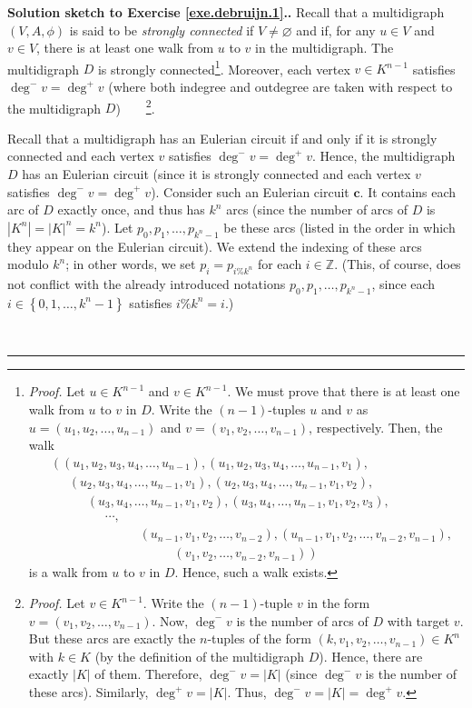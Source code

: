 \documentclass[numbers=enddot,12pt,final,onecolumn,notitlepage]{scrartcl}%
\theoremstyle{definition}
\newenvironment{proof}[1][Proof]{\noindent\textbf{#1.} }{\ \rule{0.5em}{0.5em}}
\newcommand{\ZZ}{\mathbb{Z}}
\newcommand{\set}[1]{\left\{ #1 \right\}}
\newcommand{\abs}[1]{\left| #1 \right|}
\newcommand{\tup}[1]{\left( #1 \right)}
\begin{document}
\begin{proof}[Solution sketch to Exercise \ref{exe.debruijn.1}.]
Recall that a multidigraph $\tup{V, A, \phi}$ is said to be
\textit{strongly connected} if $V \neq \varnothing$ and if, for any
$u \in V$ and $v \in V$, there is at least one walk from $u$ to $v$
in the multidigraph.
The multidigraph $D$ is strongly connected\footnote{\textit{Proof.}
Let $u \in K^{n-1}$ and $v \in K^{n-1}$. We must prove that there is
at least one walk from $u$ to $v$ in $D$. Write the $\tup{n-1}$-tuples
$u$ and $v$ as $u = \tup{u_1, u_2, \ldots, u_{n-1}}$ and
$v = \tup{v_1, v_2, \ldots, v_{n-1}}$, respectively.
Then, the walk
\begin{align*}
& \left( \tup{u_1, u_2, u_3, u_4, \ldots, u_{n-1}} , \tup{u_1, u_2, u_3, u_4, \ldots, u_{n-1}, v_1} , \right. \\
& \left. \phantom{u_1, } \tup{u_2, u_3, u_4, \ldots, u_{n-1}, v_1} , \tup{u_2, u_3, u_4, \ldots, u_{n-1}, v_1, v_2} , \right. \\
& \left. \phantom{u_1, u_2, } \tup{u_3, u_4, \ldots, u_{n-1}, v_1, v_2} , \tup{u_3, u_4, \ldots, u_{n-1}, v_1, v_2, v_3} , \right. \\
& \left. \phantom{u_1, u_2, u_3, } \cdots , \right. \\
& \left. \phantom{u_1, u_2, u_3, u_4, \ldots, } \tup{u_{n-1}, v_1, v_2, \ldots, v_{n-2}} , \tup{u_{n-1}, v_1, v_2, \ldots, v_{n-2}, v_{n-1}} , \right. \\
& \left. \phantom{u_1, u_2, u_3, u_4, \ldots, u_{n-1}, } \tup{v_1, v_2, \ldots, v_{n-2}, v_{n-1}} \right)
\end{align*}
is a walk from $u$ to $v$ in $D$. Hence, such a walk exists.}.
Moreover, each vertex $v \in K^{n-1}$ satisfies
$\deg^- v = \deg^+ v$ (where both indegree and outdegree are taken
with respect to the multidigraph $D$)\ \ \ \ \footnote{\textit{Proof.}
Let $v \in K^{n-1}$. Write the $\tup{n-1}$-tuple $v$ in the form
$v = \tup{v_1, v_2, \ldots, v_{n-1}}$.
Now, $\deg^- v$ is the number of arcs of $D$
with target $v$. But these arcs are exactly the $n$-tuples of the
form $\tup{k, v_1, v_2, \ldots, v_{n-1}} \in K^n$ with $k \in K$
(by the definition of the multidigraph $D$). Hence, there are
exactly $\abs{K}$ of them. Therefore, $\deg^- v = \abs{K}$ (since
$\deg^- v$ is the number of these arcs). Similarly,
$\deg^+ v = \abs{K}$. Thus, $\deg^- v = \abs{K} = \deg^+ v$.}.

Recall that a multidigraph has an Eulerian circuit if and only if it
is strongly connected and each vertex $v$ satisfies
$\deg^- v = \deg^+ v$. Hence, the multidigraph $D$ has an Eulerian
circuit (since it is strongly connected and each vertex $v$ satisfies
$\deg^- v = \deg^+ v$). Consider such an Eulerian circuit
$\mathbf{c}$. It contains
each arc of $D$ exactly once, and thus has $k^n$ arcs (since
the number of arcs of $D$ is $\abs{K^n} = \abs{K}^n = k^n$).
Let $p_0, p_1, \ldots, p_{k^n-1}$ be these arcs (listed in the order
in which they appear on the Eulerian circuit). We extend the
indexing of these arcs modulo $k^n$; in other words, we set
$p_i = p_{i \% k^n}$ for each $i \in \ZZ$. (This, of course, does not
conflict with the already introduced notations 
$p_0, p_1, \ldots, p_{k^n-1}$, since each
$i \in \set{0, 1, \ldots, k^n-1}$ satisfies $i \% k^n = i$.)


\end{proof}
\end{document}
